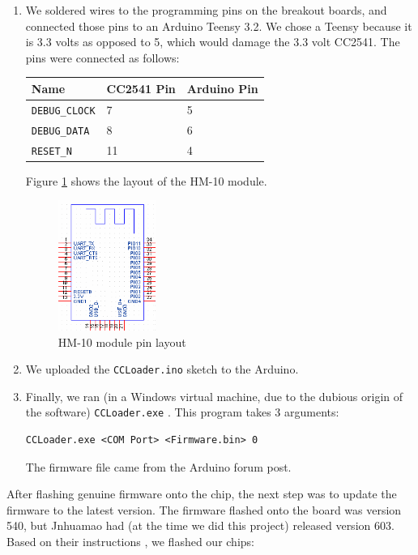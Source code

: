 \documentclass[]{article}
\begin{document}
\begin{enumerate}
\item
  We soldered wires to the programming pins on the breakout boards, and connected those pins to an Arduino Teensy 3.2.
  We chose a Teensy because it is 3.3 volts as opposed to 5, which would damage the 3.3 volt CC2541. The pins were connected as follows:

  \begin{longtable}[]{@{}lll@{}}
  \toprule
  Name & CC2541 Pin & Arduino Pin\tabularnewline
  \midrule
  \endhead
  \texttt{DEBUG\_CLOCK} & 7 & 5\tabularnewline
  \texttt{DEBUG\_DATA} & 8 & 6\tabularnewline
  \texttt{RESET\_N} & 11 & 4\tabularnewline
  \bottomrule
  \end{longtable}

  Figure \ref{fig:hm10} shows the layout of the HM-10 module.
  \begin{figure}
    \centering
    \includegraphics[width=0.3\textwidth]{hm10_pins.png}
    \caption{HM-10 module pin layout \cite{crystal}}
    \label{fig:hm10}
  \end{figure}

\item
  We uploaded the \texttt{CCLoader.ino} \cite{ccloader} sketch to the Arduino.
\item
  Finally, we ran (in a Windows virtual machine, due to the dubious origin of the software) \texttt{CCLoader.exe} \cite{ccloaderexe}.
  This program takes 3 arguments:

  \begin{Verbatim}[gobble=4]
    CCLoader.exe <COM Port> <Firmware.bin> 0
  \end{Verbatim}

  The firmware file came from the Arduino forum post. \cite{firmwarefile}
\end{enumerate}

After flashing genuine firmware onto the chip, the next step was to update the firmware to the latest version.
The firmware flashed onto the board was version 540, but Jnhuamao had (at the time we did this project) released version 603. \cite{jnhuamao603}
Based on their instructions \cite{jnhuamaoinstructions}, we flashed our chips:
\end{document}
